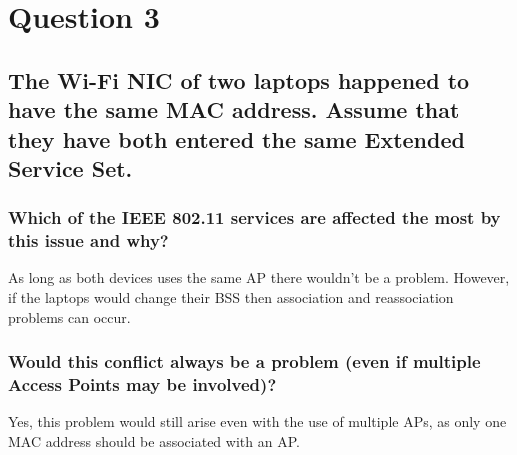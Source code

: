 \documentclass{report}
\begin{document}
	\section{Question 3}
	\startsection
		\renewcommand{\thesubsection}{\thesection.\Alph{subsection}}
		\subsection{The Wi-Fi NIC of two laptops happened to have the same MAC address. Assume that they have both entered the same Extended Service Set.}
		\startsubsection
			\subsubsection{Which of the IEEE 802.11 services are affected the most by this issue and why?}
			\startsubsection
				As long as both devices uses the same AP there wouldn't be a problem. However, if the laptops would change their BSS then association and reassociation problems can occur.
			\closesection
			\subsubsection{Would this conflict always be a problem (even if multiple Access Points may be involved)?}
			\startsubsection
				Yes, this problem would still arise even with the use of multiple APs, as only one MAC address should be associated with an AP.
			\closesection
		\closesection
	\closesection
\end{document}
